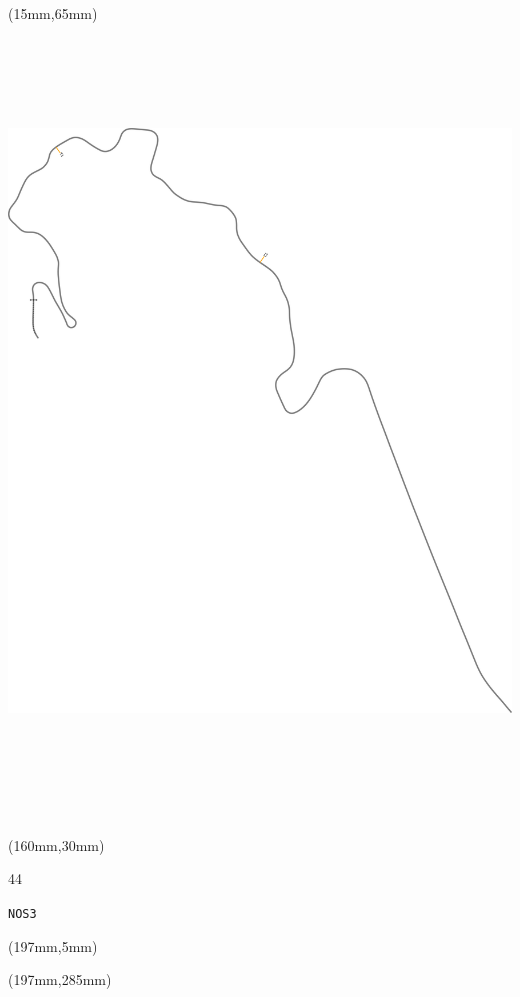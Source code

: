\begin{textblock*}{185mm}(15mm,65mm)%
\centering
\mbox{\includegraphics[width=185mm,height=210mm,keepaspectratio]{PT/NOS3.pdf}}
\end{textblock*}
\begin{textblock*}{40mm}(160mm,30mm)%
\Large
\par{} 
\par44 
\par\hfill\tiny\tt NOS3\\
\end{textblock*}
\begin{textblock*}{20mm}(197mm,5mm)%
\fbox{\thepage}
\label{NOS3}
\end{textblock*}
\begin{textblock*}{20mm}(197mm,285mm)%
\fbox{\thepage}
\end{textblock*}

